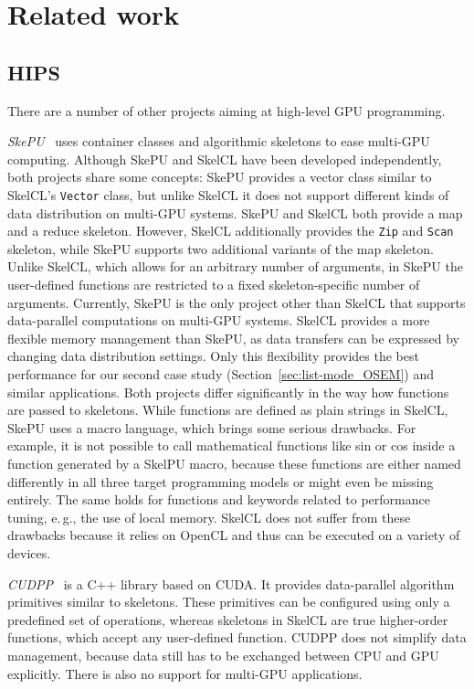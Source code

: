 \section{Related work}

\subsection{HIPS}

There are a number of other projects aiming at high-level GPU programming.

\emph{SkePU}~\cite{EnK-10} uses container classes and algorithmic skeletons to ease multi-GPU computing.
Although SkePU and SkelCL have been developed independently, both projects share some concepts:
SkePU provides a vector class similar to SkelCL's \texttt{Vector} class, but unlike SkelCL it does not support different kinds of data distribution on multi-GPU systems.
SkePU and SkelCL both provide a map and a reduce skeleton.
However, SkelCL additionally provides the \texttt{Zip} and \texttt{Scan} skeleton, while SkePU supports two additional variants of the map skeleton.
Unlike SkelCL, which allows for an arbitrary number of arguments, in SkePU the user-defined functions are restricted to a fixed skeleton-specific number of arguments.
Currently, SkePU is the only project other than SkelCL that supports data-parallel computations on multi-GPU systems.
SkelCL provides a more flexible memory management than SkePU, as data transfers can be expressed by changing data distribution settings.
Only this flexibility provides the best performance for our second case study (Section~\ref{sec:list-mode_OSEM}) and similar applications.
Both projects differ significantly in the way how functions are passed to skeletons.
While functions are defined as plain strings in SkelCL, SkePU uses a macro language, which brings some serious drawbacks.
For example, it is not possible to call mathematical functions like sin or cos inside a function generated by a SkelPU macro,
because these functions are either named differently in all three target programming models or might even be missing entirely.
The same holds for functions and keywords related to performance tuning, e.\,g., the use of local memory.
SkelCL does not suffer from these drawbacks because it relies on OpenCL and thus can be executed on a variety of devices.

\emph{CUDPP}~\cite{SeHZO-07} is a C++ library based on CUDA.
It provides data-parallel algorithm primitives similar to skeletons.
These primitives can be configured using only a predefined set of operations, whereas
skeletons in SkelCL are true higher-order functions, which accept any user-defined function.
CUDPP does not simplify data management, because data still has to be exchanged between CPU and GPU explicitly.
There is also no support for multi-GPU applications.

